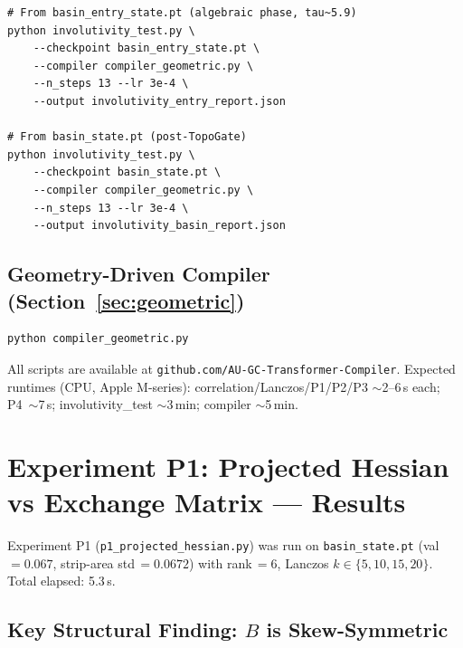 \documentclass[11pt]{amsart}
\begin{document}
\begin{verbatim}
# From basin_entry_state.pt (algebraic phase, tau~5.9)
python involutivity_test.py \
    --checkpoint basin_entry_state.pt \
    --compiler compiler_geometric.py \
    --n_steps 13 --lr 3e-4 \
    --output involutivity_entry_report.json

# From basin_state.pt (post-TopoGate)
python involutivity_test.py \
    --checkpoint basin_state.pt \
    --compiler compiler_geometric.py \
    --n_steps 13 --lr 3e-4 \
    --output involutivity_basin_report.json
\end{verbatim}

\subsection*{Geometry-Driven Compiler (Section~\ref{sec:geometric})}

\begin{verbatim}
python compiler_geometric.py
\end{verbatim}

All scripts are available at \texttt{github.com/AU-GC-Transformer-Compiler}.
Expected runtimes (CPU, Apple M-series):
correlation/Lanczos/P1/P2/P3 $\sim$2--6\,s each;
P4~$\sim$7\,s;
involutivity\_test $\sim$3\,min;
compiler $\sim$5\,min.

\section{Experiment P1: Projected Hessian vs Exchange Matrix --- Results}
\label{sec:p1_results}

Experiment P1 (\texttt{p1\_projected\_hessian.py}) was run on
\texttt{basin\_state.pt} (val\,$=0.067$, strip-area std\,$=0.0672$)
with rank\,$=6$, Lanczos $k \in \{5,10,15,20\}$.
Total elapsed: 5.3\,s.

\subsection{Key Structural Finding: $B$ is Skew-Symmetric}
\end{document}
